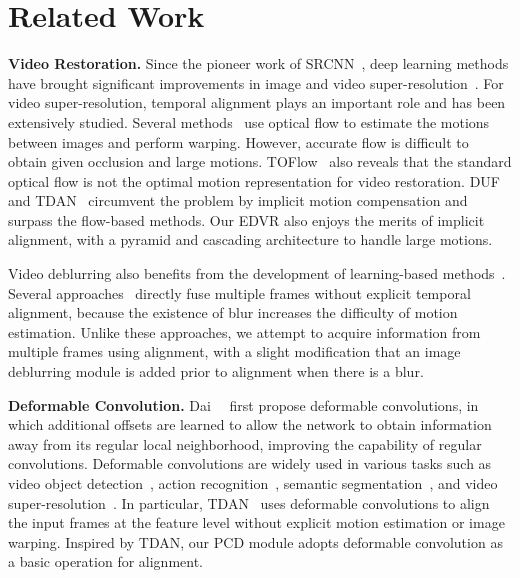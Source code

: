 \documentclass[10pt,twocolumn,letterpaper]{article}
\begin{document}
\section{Related Work}
\noindent\textbf{Video Restoration.}
Since the pioneer work of SRCNN~\cite{dong2014learning}, deep learning methods have brought significant improvements in image and video super-resolution~\cite{lim2017enhanced,timofte2017ntire,ledig2017photo,liu2018non,yu2018crafting,yu2019path,caballero2017real,liu2017robust,sajjadi2018frame,tao2017detail,xue2017video}. For video super-resolution, temporal alignment plays an important role and has been extensively studied. Several methods~\cite{caballero2017real,tao2017detail,sajjadi2018frame} use optical flow to estimate the motions between images and perform warping.
However, accurate flow is difficult to obtain given occlusion and large motions. TOFlow~\cite{xue2017video} also reveals that the standard optical flow is not the optimal motion representation for video restoration. 
DUF~\cite{jo2018deep} and TDAN~\cite{tian2018tdan} circumvent the problem by implicit motion compensation and surpass the flow-based methods. Our EDVR also enjoys the merits of implicit alignment, with a pyramid and cascading architecture to handle large motions.

Video deblurring also benefits from the development of learning-based methods~\cite{kim2018dynamic,ma2015handling,pan2017simultaneous,su2017deep}. Several approaches~\cite{su2017deep,zhang2019adversarial} directly fuse multiple frames without explicit temporal alignment, because the existence of blur increases the difficulty of motion estimation. Unlike these approaches, we attempt to acquire information from multiple frames using alignment, with a slight modification that an image deblurring module is added prior to alignment when there is a blur.

\noindent\textbf{Deformable Convolution.} 
Dai~\etal~\cite{dai2017deformable} first propose deformable convolutions, in which additional offsets are learned to allow the network to obtain information away from its regular local neighborhood, improving the capability of regular convolutions.
Deformable convolutions are widely used in various tasks such as video object detection~\cite{bertasius2018object}, action recognition~\cite{zhao2018trajectory}, semantic segmentation~\cite{dai2017deformable}, and video super-resolution~\cite{tian2018tdan}. In particular, TDAN~\cite{tian2018tdan} uses deformable convolutions to align the input frames at the feature level without explicit motion estimation or image warping. Inspired by TDAN, our PCD module adopts deformable convolution as a basic operation for alignment.
\end{document}
